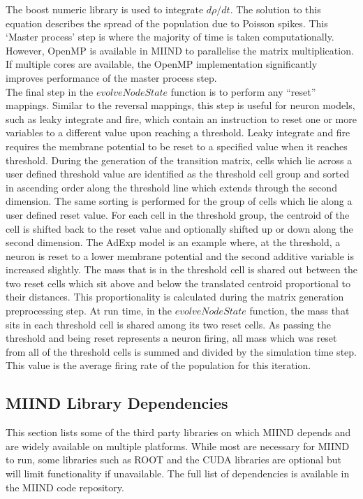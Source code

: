 \documentclass[utf8]{frontiers_suppmat} %
\begin{document}
The boost numeric library is used to integrate $d\rho/dt$. The solution to this equation describes the spread of the population due to Poisson spikes. This `Master process' step is where the majority of time is taken computationally. However, OpenMP is available in MIIND to parallelise the matrix multiplication. If multiple cores are available, the OpenMP implementation significantly improves performance of the master process step.\\
The final step in the $evolveNodeState$ function is to perform any ``reset'' mappings. Similar to the reversal mappings, this step is useful for neuron models, such as leaky integrate and fire, which contain an instruction to reset one or more variables to a different value upon reaching a threshold. Leaky integrate and fire requires the membrane potential to be reset to a specified value when it reaches threshold. During the generation of the transition matrix, cells which lie across a user defined threshold value are identified as the threshold cell group and sorted in ascending order along the threshold line which extends through the second dimension. The same sorting is performed for the group of cells which lie along a user defined reset value. For each cell in the threshold group, the centroid of the cell is shifted back to the reset value and optionally shifted up or down along the second dimension. The AdExp model is an example where, at the threshold, a neuron is reset to a lower membrane potential and the second additive variable is increased slightly. The mass that is in the threshold cell is shared out between the two reset cells which sit above and below the translated centroid proportional to their distances. This proportionality is calculated during the matrix generation preprocessing step. At run time, in the $evolveNodeState$ function, the mass that sits in each threshold cell is shared among its two reset cells. As passing the threshold and being reset represents a neuron firing, all mass which was reset from all of the threshold cells is summed and divided by the simulation time step. This value is the average firing rate of the population for this iteration.\\

\subsection{MIIND Library Dependencies}
\label{miinddependencies}
This section lists some of the third party libraries on which MIIND depends and are widely available on multiple platforms. While most are necessary for MIIND to run, some libraries such as ROOT and the CUDA libraries are optional but will limit functionality if unavailable. The full list of dependencies is available in the MIIND code repository.
\end{document}
